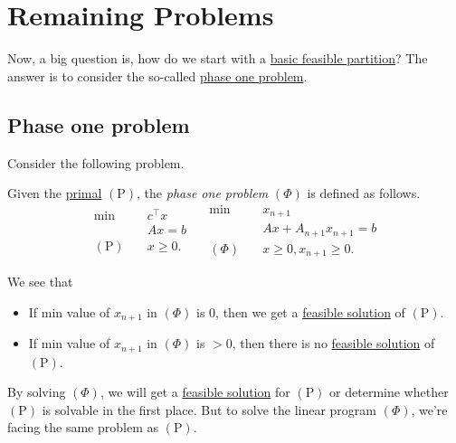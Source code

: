 \section{Remaining Problems}
Now, a big question is, how do we start with a \hyperref[def:basic-partition]{basic feasible partition}? The answer is to consider the so-called \hyperref[def:phase-one-problem]{phase one problem}.

\subsection{Phase one problem}
Consider the following problem.

\begin{definition}\label{def:phase-one-problem}
	Given the \hyperref[def:primal]{primal} \((\mathrm{P})\), the \emph{phase one problem} \((\Phi)\) is defined as follows.
	\[
		\begin{aligned}
			\min~             & c^{\top}x   \\
			                  & Ax = b      \\
			(\mathrm{P})\quad & x\geq  0 	.
		\end{aligned}\quad \begin{aligned}
			\min~       & x_{n+1}                   \\
			            & Ax + A_{n+1}x_{n+1} = b   \\
			(\Phi)\quad & x\geq 0, x_{n+1} \geq  0.
		\end{aligned}
	\]
\end{definition}

\begin{remark}
	We see that
	\begin{itemize}
		\item If min value of \(x_{n+1}\) in \((\Phi)\) is 0, then we get a \hyperref[def:feasible-solution]{feasible solution} of \((\mathrm{P})\).
		\item If min value of \(x_{n+1}\) in \((\Phi)\) is \(>0\), then there is no \hyperref[def:feasible-solution]{feasible solution} of \((\mathrm{P})\).
	\end{itemize}
\end{remark}

By solving \((\Phi)\), we will get a \hyperref[def:feasible-solution]{feasible solution} for \((\mathrm{P})\) or determine whether \((\mathrm{P})\) is solvable in the first place. But to solve the linear program \((\Phi)\), we're facing the same problem as \((\mathrm{P})\).

